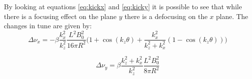 \documentclass{article}
\begin{document}
By looking at equations \ref{eq:kickx} and \ref{eq:kicky} it is possible to see that while there is a focusing effect on the plane $y$ there is a defocusing on the $x$ plane.
The changes in tune are given by:
\begin{equation}
\Delta \nu_{x} = -\beta \frac{k_x^2}{k_z^2}\frac{L^2B_0^2}{16\pi R^2}\bigg(1+\cos(k_z\theta)+\frac{k_x^2}{k_z^2+k_x^2}\left(1-\cos(k_z\theta)\right)\bigg)
\end{equation}


\begin{equation}
\Delta \nu_{y} = \beta \frac{k_z^2+k_x^2}{k_z^2}\frac{L^2B_0^2}{8\pi R^2}
\end{equation}
\end{document}
